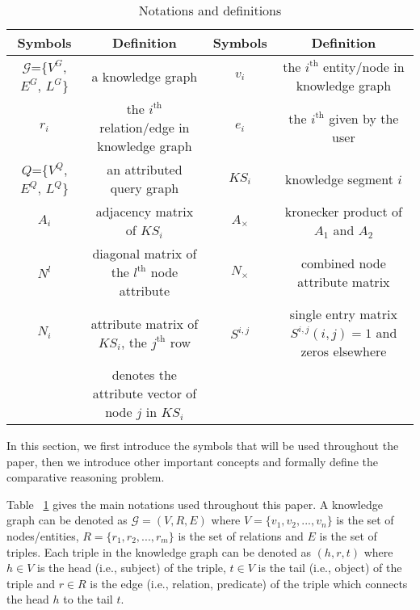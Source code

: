 \begin{table}[]
	\centering
	\footnotesize
	\caption{Notations and definitions}
	\setlength\tabcolsep{1.5pt}
	\begin{tabular}{|c|c|c|c|}
		\hline
		{\bf Symbols}       & {\bf Definition}     & {\bf Symbols}       & {\bf Definition}              \\ \hline
		$\mathcal{G}$=\{$V^G$, $E^G$, $L^G$\} & a knowledge graph  & $v_i$         & the $i^\textrm{th}$ entity/node in knowledge graph \\ \hline
		$r_i$         & the $i^\textrm{th}$ relation/edge in knowledge graph & $e_i$         & the $i^\textrm{th}$ given by the user   \\ \hline
		
		${Q}$=\{$V^Q$, $E^Q$, $L^Q$\} & an attributed query graph &  $KS_i$         & knowledge segment $i$  \\ \hline
		
		$A_i$         & adjacency matrix of $KS_i$   &  $A_{\times}$      & kronecker product of $A_1$ and $A_2$      \\ \hline
		$N^l$      & diagonal matrix of the $l^\textrm{th}$ node attribute  & $N_{\times}$      &  combined node attribute matrix  \\ \hline
		
		
		$N_i$         & {attribute matrix of $KS_i$, the $j^\textrm{th}$ row} &  $S^{i,j}$          & single entry matrix $S^{i,j}(i,j)=1$ and zeros elsewhere  \\ 
		 ~ & {denotes the attribute vector of node $j$ in $KS_i$} & & \\ \hline
		
	\end{tabular}
\label{notation}
\end{table}

In this section, we  first introduce the  symbols that will be used throughout the paper, then we introduce other important concepts and formally define the comparative reasoning problem.

Table ~\ref{notation} gives the main notations used throughout this paper. 
A knowledge graph can be denoted as $\mathcal{G}=(V, R, E)$ where $V = \{v_1, v_2, ..., v_n\}$ is the set of nodes/entities, $R = \{r_1, r_2, ..., r_m\}$ is the set of relations and $E$ is the set of triples.
Each triple in the knowledge graph can be denoted as $(h, r, t)$ where $h \in V$ is the head (i.e., subject) of the triple, $t \in V$ is the tail (i.e., object) of the triple and $r \in R$ is the edge (i.e., relation, predicate) of the triple which connects the head $h$ to the tail $t$. 

